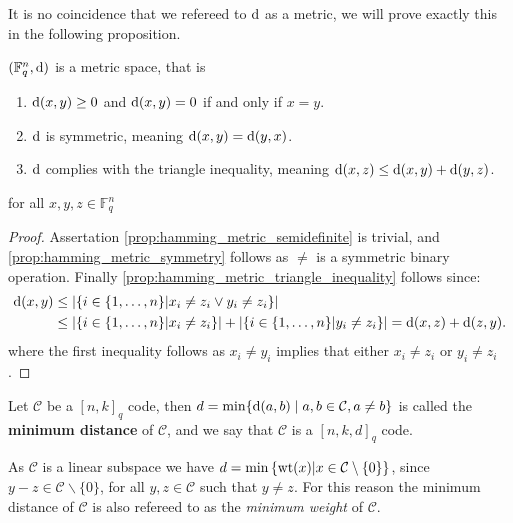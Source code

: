 It is no coincidence that we refereed to $\mathrm{d}$ as a metric, we will prove exactly this in the following proposition.
\begin{proposition}\label{prop:hamming_metric}
  $(\mathbb{F}_{q}^{n}, \mathrm{d})$ is a metric space, that is
  \begin{enumerate}
    \item $\mathrm{d}(x, y) \geq 0$ and $\mathrm{d}(x, y) = 0$ if and only if $x = y$. \label{prop:hamming_metric_semidefinite}
    \item $\mathrm{d}$ is symmetric, meaning $\mathrm{d}(x, y) = \mathrm{d}(y, x)$. \label{prop:hamming_metric_symmetry}
    \item $\mathrm{d}$ complies with the triangle inequality, meaning $\mathrm{d}(x, z) \leq \mathrm{d}(x, y) + \mathrm{d}(y, z)$. \label{prop:hamming_metric_triangle_inequality}
  \end{enumerate}
  for all $x, y, z \in \mathbb{F}_{q}^{n}$
\end{proposition}
\begin{proof}
Assertation \ref{prop:hamming_metric_semidefinite} is trivial, and \ref{prop:hamming_metric_symmetry} follows as $\not =$ is a symmetric binary operation. Finally \ref{prop:hamming_metric_triangle_inequality} follows since:
  \begin{align*}
    \mathrm{d}(x, y) &\leq \left\lvert\{i \in \left\{1, \ldots, n\right\} \middle| x_{i} \neq z_{i} \vee y_{i} \neq z_{i}\}\right\rvert\\
    &\leq\left\lvert\{i \in \left\{1, \ldots, n\right\} \middle| x_{i} \neq z_{i}\}\right\rvert + \left\lvert\{i \in \left\{1, \ldots, n\right\} \middle| y_{i} \neq z_{i}\}\right\rvert = \mathrm{d}(x, z) + \mathrm{d}(z, y).
  \end{align*}
  where the first inequality follows as $x_{i} \neq y_{i}$ implies that either $x_{i} \neq z_{i}$ or $y_{i} \neq z_{i}$.
\end{proof}
\begin{definition}
  Let $\mathcal{C}$ be a $[n, k]_q$ code, then $d = \min\{\mathrm{d}(a, b) \;\vert\; a, b \in \mathcal{C}, a \neq b\}$ is called the \textbf{minimum distance} of $\mathcal{C}$, and we say that $\mathcal{C}$ is a $[n,k,d]_q$ code.
\end{definition}

\begin{remark}\label{rem:min_dist_is_the_same_as_min_weight}
  As $\mathcal{C}$ is a linear subspace we have $d=\min\left\{\mathrm{wt}(x) \middle| x \in \mathcal{C} \setminus \left\{0\right\}\right\}$, since $y - z \in \mathcal{C} \backslash \{0\}$, for all $y, z \in \mathcal{C}$ such that $y \neq z$. For this reason the minimum distance of $\mathcal{C}$ is also refereed to as the \textit{minimum weight} of $\mathcal{C}$.
\end{remark}

